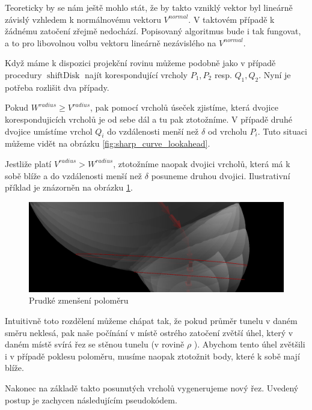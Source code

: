 Teoreticky by se nám ještě mohlo stát, že by takto vzniklý vektor byl lineárně
závislý vzhledem k normálnovému vektoru $ V^{normal} $. V taktovém případě k žádnému
zatočení zřejmě nedochází. Popisovaný algoritmus bude i tak fungovat,
a to pro libovolnou volbu vektoru lineárně nezávislého na $ V^{normal} $.

Když máme k dispozici projekční rovinu můžeme podobně jako v případě
procedury $ \operatorname{shiftDisk} $ najít korespondující
vrcholy $ P_1, P_2 $ resp. $ Q_1, Q_2 $. Nyní je potřeba rozlišit dva případy.

Pokud $ W^{radius} \geq V^{radius} $, pak pomocí vrcholů úseček zjistíme, která
dvojice korespondujicích vrcholů je od sebe dál a tu pak ztotožníme. V případě
druhé dvojice umístíme vrchol $Q_i $ do vzdálenosti menší než $\delta$ od vrcholu
$ P_i $. Tuto situaci můžeme vidět na obrázku \ref{fig:sharp_curve_lookahead}.

Jestliže platí $ V^{radius} > W^{radius} $, ztotožníme naopak dvojici vrcholů,
která má k sobě blíže a do vzdálenosti menší než $\delta$ posuneme druhou dvojici.
Ilustrativní příklad je znázorněn na obrázku \ref{fig:sharp_curve_lookahead_decrease}.

\begin{figure}[ht]
    \centering
    \includegraphics[width=\textwidth]{img/sharp_curve_lookahead_decrease.png}
    \caption{Prudké zmenšení poloměru}
  \centering
  \label{fig:sharp_curve_lookahead_decrease}
\end{figure}

Intuitivně toto rozdělení můžeme chápat tak, že pokud průměr tunelu v daném směru
neklesá, pak naše počínání v místě ostrého zatočení zvětší úhel, který v daném
místě svírá řez se stěnou tunelu (v rovině $ \rho $ ). Abychom tento úhel zvětšili
i v případě poklesu poloměru, musíme naopak ztotožnit body, které k sobě mají
blíže.

Nakonec na základě takto posunutých vrcholů vygenerujeme nový řez. Uvedený
postup je zachycen následujícím pseudokódem.


